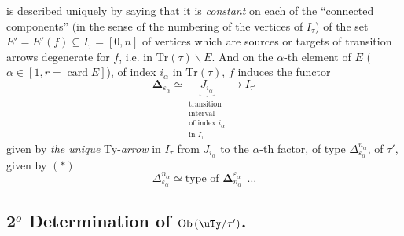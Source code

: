 is described uniquely by saying that it is \textit{constant} on each of the ``connected components'' (in the sense of the numbering of the vertices of $I_\tau$) of the set $E' = E'(f) \subseteq I_\tau = [0,n]$ of vertices which are sources or targets of transition arrows degenerate for $f$, i.e. in $\mathrm{Tr}(\tau)\backslash E$. And on the $\alpha$-th element of $E$ ($\alpha \in [1, r = \operatorname{card} E]$), of index $i_\alpha$ in $\mathrm{Tr}(\tau)$, $f$ induces the functor
\[
\boldsymbol{\Delta}_{\varepsilon_\alpha} \simeq \underbrace{J_{i_\alpha}}_{\substack{\text{transition}\\ \text{interval}\\ \text{of index } i_\alpha\\ \text{in } I_\tau}} \longrightarrow I_{\tau'}
\]
given by \textit{the unique} \underline{Ty}-\textit{arrow} in $I_\tau$ from $J_{i_\alpha}$ to the $\alpha$-th factor, of type $\Delta^{n_\alpha}_{\varepsilon_\alpha}$, of $\tau'$, given by $(*)$
\[
\Delta^{n_\alpha}_{\varepsilon_\alpha} \simeq \text{type of } \boldsymbol{\Delta}^{\varepsilon_\alpha}_{n_\alpha}\ \ \ldots
\]

\subsection*{2$^o$ Determination of $\mathrm{Ob}\,(\uTy/\tau')$.}

